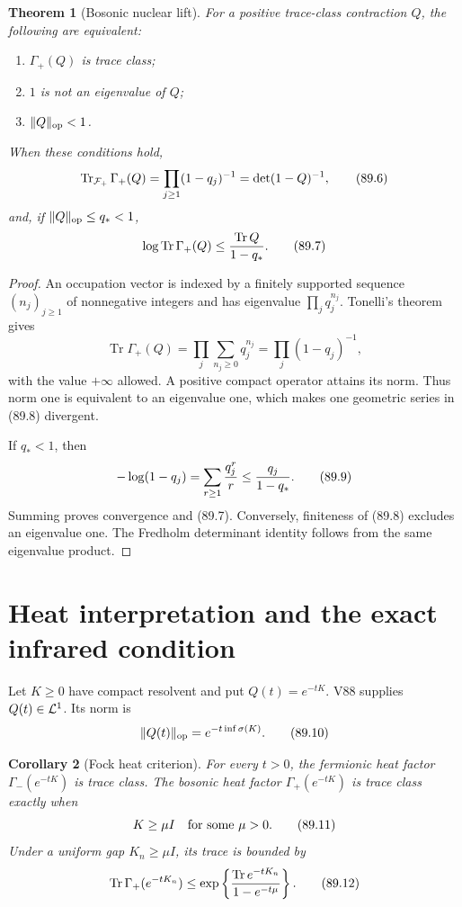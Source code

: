 \documentclass[11pt]{article}
\newtheorem{theorem}{Theorem}[section]
\newtheorem{corollary}[theorem]{Corollary}
\theoremstyle{remark}
\begin{document}
\begin{theorem}[Bosonic nuclear lift]
\label{thm:v15v89-boson}
For a positive trace-class contraction \(Q\), the following are
equivalent:
\begin{enumerate}
\item \(\Gamma_+(Q)\) is trace class;
\item \(1\) is not an eigenvalue of \(Q\);
\item \(\|Q\|_{\rm op}<1\).
\end{enumerate}
When these conditions hold,
\[
 \operatorname{Tr}_{{\cal F}_{+}}\Gamma_+(Q)
 =\prod_{j\geq1}(1-q_j)^{-1}
 =\det(1-Q)^{-1},                                     \tag{89.6}
\]
and, if \(\|Q\|_{\rm op}\leq q_*<1\),
\[
 \log\operatorname{Tr}\Gamma_+(Q)
 \leq {\operatorname{Tr}Q\over1-q_*}.                \tag{89.7}
\]
\end{theorem}

\begin{proof}
An occupation vector is indexed by a finitely supported sequence
\((n_j)_{j\geq1}\) of nonnegative integers and has eigenvalue
\(\prod_jq_j^{n_j}\).  Tonelli's theorem gives
\[
 \operatorname{Tr}\Gamma_+(Q)
 =\prod_j\sum_{n_j\geq0}q_j^{n_j}
 =\prod_j(1-q_j)^{-1},                                \tag{89.8}
\]
with the value \(+\infty\) allowed.  A positive compact operator
attains its norm.  Thus norm one is equivalent to an eigenvalue
one, which makes one geometric series in (89.8) divergent.

If \(q_*<1\), then
\[
 -\log(1-q_j)=\sum_{r\geq1}{q_j^r\over r}
 \leq {q_j\over1-q_*}.                               \tag{89.9}
\]
Summing proves convergence and (89.7).  Conversely, finiteness of
(89.8) excludes an eigenvalue one.  The Fredholm determinant
identity follows from the same eigenvalue product.
\end{proof}

\section{Heat interpretation and the exact infrared condition}

Let \(K\geq0\) have compact resolvent and put \(Q(t)=e^{-tK}\).
V88 supplies \(Q(t)\in{\cal L}^1\).  Its norm is
\[
 \|Q(t)\|_{\rm op}=e^{-t\inf\sigma(K)}.              \tag{89.10}
\]

\begin{corollary}[Fock heat criterion]
\label{cor:v15v89-heat}
For every \(t>0\), the fermionic heat factor
\(\Gamma_-(e^{-tK})\) is trace class.  The bosonic heat factor
\(\Gamma_+(e^{-tK})\) is trace class exactly when
\[
 K\geq\mu I\quad\hbox{for some }\mu>0.                \tag{89.11}
\]
Under a uniform gap \(K_n\geq\mu I\), its trace is bounded by
\[
 \operatorname{Tr}\Gamma_+(e^{-tK_n})
 \leq
 \exp\left\{{\operatorname{Tr}e^{-tK_n}\over1-e^{-t\mu}}\right\}. \tag{89.12}
\]
\end{corollary}
\end{document}
